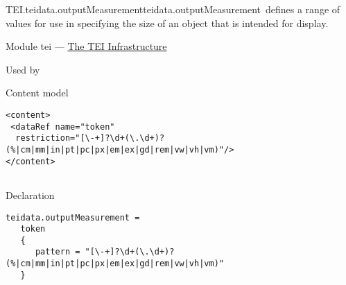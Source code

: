 \begin{reflist}
\item[]\begin{specHead}{TEI.teidata.outputMeasurement}{teidata.outputMeasurement} defines a range of values for use in specifying the size of an object that is intended for display.\end{specHead} 
    \item[{Module}]
  tei — \hyperref[ST]{The TEI Infrastructure}
    \item[{Used by}]
  
    \item[{Content model}]
  \mbox{}\hfill\\[-10pt]\begin{Verbatim}[fontsize=\small]
<content>
 <dataRef name="token"
  restriction="[\-+]?\d+(\.\d+)?(%|cm|mm|in|pt|pc|px|em|ex|gd|rem|vw|vh|vm)"/>
</content>
    
\end{Verbatim}

    \item[{Declaration}]
  \mbox{}\hfill\\[-10pt]\begin{Verbatim}[fontsize=\small]
teidata.outputMeasurement =
   token
   {
      pattern = "[\-+]?\d+(\.\d+)?(%|cm|mm|in|pt|pc|px|em|ex|gd|rem|vw|vh|vm)"
   }
\end{Verbatim}


\end{reflist}
